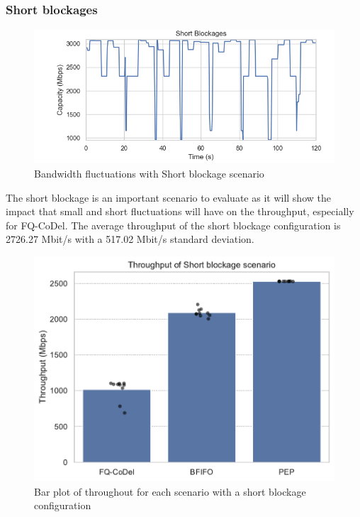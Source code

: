 \documentclass[a4paper,english, 11pt]{report}
\begin{document}
\subsubsection{Short blockages}
\begin{figure}[h!] %
	\centering
	\includegraphics[scale=0.60]{../diagrams/witestlab/sb.png}
  	\caption{Bandwidth fluctuations with Short blockage scenario}
  	\label{fig:sb_fluctuations}
\end{figure}

The short blockage is an important scenario to evaluate as it will show the impact that small and short fluctuations will have on the throughput, especially for FQ-CoDel. The average throughput of the short blockage configuration is 2726.27 Mbit/s with a 517.02 Mbit/s standard deviation.\\


\begin{figure}[!h!] %
	\centering
	\includegraphics[scale=0.70]{../diagrams/witestlab/throughput/throughput_sb.pdf}
  	\caption{Bar plot of throughout for each scenario with a short blockage configuration}
  	\label{fig:throughput_sb}
\end{figure}
\end{document}
